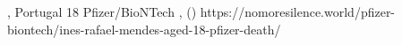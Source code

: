           {, Portugal}
          {18}
          {Pfizer/BioNTech}
          {}
          {
            ,
             ()
          }
          {https://nomoresilence.world/pfizer-biontech/ines-rafael-mendes-aged-18-pfizer-death/}


